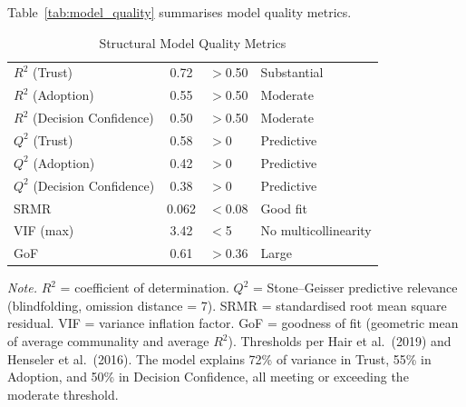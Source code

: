 Table~\ref{tab:model_quality} summarises model quality metrics.

\begin{table}[!htbp]
\tablestripes
\caption{Structural Model Quality Metrics}
\tablefontsize
\begin{tabularx}{\textwidth}{@{} >{\raggedright\arraybackslash}p{4.5cm} C >{\raggedright\arraybackslash}p{2.5cm} L @{}}
\toprule
{} &  &  &  \\
\midrule
$R^2$ (Trust) & 0.72 & $>$0.50 & Substantial \\
$R^2$ (Adoption) & 0.55 & $>$0.50 & Moderate \\
$R^2$ (Decision Confidence) & 0.50 & $>$0.50 & Moderate \\
\addlinespace
$Q^2$ (Trust) & 0.58 & $>$0 & Predictive \\
$Q^2$ (Adoption) & 0.42 & $>$0 & Predictive \\
$Q^2$ (Decision Confidence) & 0.38 & $>$0 & Predictive \\
\addlinespace
SRMR & 0.062 & $<$0.08 & Good fit \\
VIF (max) & 3.42 & $<$5 & No multicollinearity \\
GoF & 0.61 & $>$0.36 & Large \\
\bottomrule
\end{tabularx}
\vspace{0.5em}\noindent\textit{Note.} $R^2$ = coefficient of determination. $Q^2$ = Stone--Geisser predictive relevance (blindfolding, omission distance = 7). SRMR = standardised root mean square residual. VIF = variance inflation factor. GoF = goodness of fit (geometric mean of average communality and average $R^2$). Thresholds per Hair et al.\ (2019) and Henseler et al.\ (2016). The model explains 72\% of variance in Trust, 55\% in Adoption, and 50\% in Decision Confidence, all meeting or exceeding the moderate threshold.
\end{table}
\fi %





